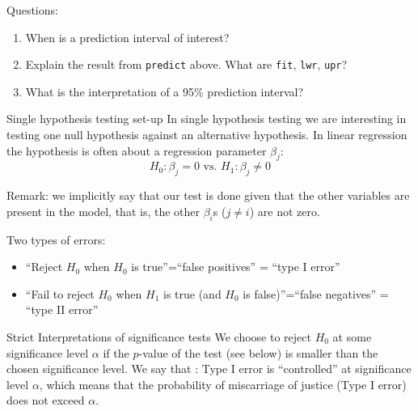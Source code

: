 \documentclass[
  ignorenonframetext,
]{beamer}
\begin{document}
\begin{frame}[fragile]
\begin{block}{Questions:}
\label{questions}
\begin{enumerate}
\item
  {When is a prediction interval of interest? }
\item
  {Explain the result from \texttt{predict} above. What are
  \texttt{fit}, \texttt{lwr}, \texttt{upr}?}
\item
  {What is the interpretation of a 95\% prediction interval? }
\end{enumerate}
\end{block}
\end{frame}

\begin{frame}
\begin{block}{Single hypothesis testing set-up}
\label{single-hypothesis-testing-set-up}
In single hypothesis testing we are interesting in testing one null
hypothesis against an alternative hypothesis. In linear regression the
hypothesis is often about a regression parameter \(\beta_j\):
\[H_0: \beta_j=0 \text{ vs. } H_1: \beta_j\neq 0\]

Remark: we implicitly say that our test is done given that the other
variables are present in the model, that is, the other \(\beta_i\)s
(\(j\neq i\)) are not zero.
\end{block}
\end{frame}

\begin{frame}
\begin{block}{Two types of errors:}
\label{two-types-of-errors}
\begin{itemize}
\item
  ``Reject \(H_0\) when \(H_0\) is true''=``false positives'' = ``type I
  error''
\item
  ``Fail to reject \(H_0\) when \(H_1\) is true (and \(H_0\) is
  false)''=``false negatives'' = ``type II error''
\end{itemize}
\end{block}
\end{frame}

\begin{frame}
\begin{block}{Strict Interpretations of significance tests}
\label{strict-interpretations-of-significance-tests}
We choose to reject \(H_0\) at some significance level \(\alpha\) if the
\(p\)-value of the test (see below) is smaller than the chosen
significance level. We say that : Type I error is ``controlled'' at
significance level \(\alpha\), which means that the probability of
miscarriage of justice (Type I error) does not exceed \(\alpha\).
\end{block}
\end{frame}
\end{document}
